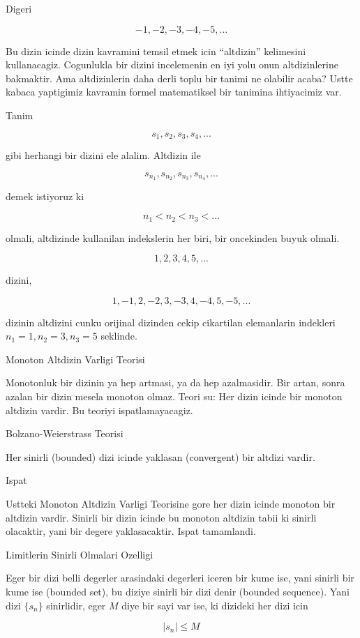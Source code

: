 \documentclass[12pt,fleqn]{article}\usepackage{../common}
\begin{document}
Digeri 

\[ -1, -2, -3, -4, -5, ... \]

Bu dizin icinde dizin kavramini temsil etmek icin ``altdizin'' kelimesini
kullanacagiz. Cogunlukla bir dizini incelemenin en iyi yolu onun
altdizinlerine bakmaktir. Ama altdizinlerin daha derli toplu bir tanimi ne
olabilir acaba? Ustte kabaca yaptigimiz kavramin formel matematiksel bir
tanimina ihtiyacimiz var. 

Tanim

\[ s_1, s_2,s_3,s_4,...\]

gibi herhangi bir dizini ele alalim. Altdizin ile 

\[ s_{n_1},s_{n_2},s_{n_3},s_{n_4},... \]

demek istiyoruz ki

\[ n_1 < n_2 < n_3 < ... \]

olmali, altdizinde kullanilan indekslerin her biri, bir oncekinden buyuk
olmali. 

\[ 1, 2, 3, 4, 5, ... \]

dizini, 

\[ 1, -1, 2, -2, 3, -3, 4, -4, 5, -5, . . . \]

dizinin altdizini cunku orijinal dizinden cekip cikartilan elemanlarin
indekleri $n_1=1,n_2 = 3,n_3 = 5$ seklinde. 

Monoton Altdizin Varligi Teorisi

Monotonluk bir dizinin ya hep artmasi, ya da hep azalmasidir. Bir artan,
sonra azalan bir dizin mesela monoton olmaz. Teori su: Her dizin icinde
bir monoton altdizin vardir. Bu teoriyi ispatlamayacagiz. 

Bolzano-Weierstrass Teorisi 

Her sinirli (bounded) dizi icinde yaklasan (convergent) bir altdizi
vardir. 

Ispat

Ustteki Monoton Altdizin Varligi Teorisine gore her dizin icinde
monoton bir altdizin vardir. Sinirli bir dizin icinde bu monoton altdizin
tabii ki sinirli olacaktir, yani bir degere yaklasacaktir. Ispat
tamamlandi. 

Limitlerin Sinirli Olmalari Ozelligi 

Eger bir dizi belli degerler arasindaki degerleri iceren bir kume ise, yani
sinirli bir kume ise (bounded set), bu diziye sinirli bir dizi denir
(bounded sequence). Yani dizi $\{s_n\}$ sinirlidir, eger $M$ diye bir sayi
var ise, ki dizideki her dizi icin 

\[ |s_n| \le M \]
\end{document}
